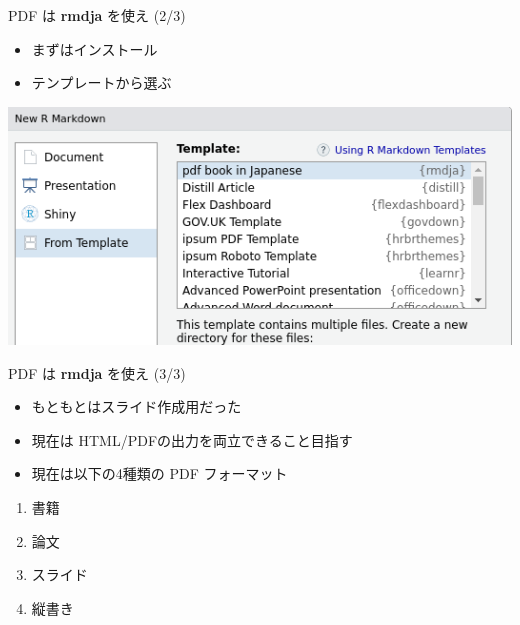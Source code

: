 \documentclass[
  ignorenonframetext,
]{beamer}
\providecommand{\tightlist}{%
  \setlength{\itemsep}{0pt}\setlength{\parskip}{0pt}}
\begin{document}
\begin{frame}{PDF は \textbf{rmdja} を使え (2/3)}
\protect\hypertarget{pdf-ux306f-rmdja-ux3092ux4f7fux3048-23}{}
\begin{itemize}
\tightlist
\item
  まずはインストール
\item
  テンプレートから選ぶ
\end{itemize}

\begin{center}\includegraphics[width=1\linewidth,height=1\textheight,keepaspectratio]{img/templates} \end{center}
\end{frame}

\begin{frame}{PDF は \textbf{rmdja} を使え (3/3)}
\protect\hypertarget{pdf-ux306f-rmdja-ux3092ux4f7fux3048-33}{}
\begin{itemize}
\tightlist
\item
  もともとはスライド作成用だった
\item
  現在は HTML/PDFの出力を両立できること目指す
\item
  現在は以下の4種類の PDF フォーマット
\end{itemize}

\begin{enumerate}
\tightlist
\item
  書籍
\item
  論文
\item
  スライド
\item
  縦書き
\end{enumerate}
\end{frame}
\end{document}
